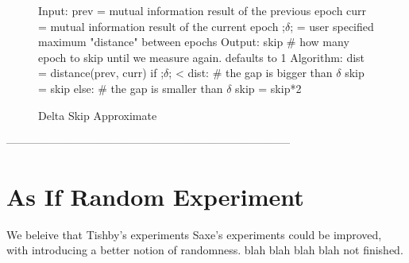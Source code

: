 \begin{figure}[H]
    \begin{pythonfigure}
      Input:
      prev = mutual information result of the previous epoch
      curr = mutual information result of the current epoch
      ;$\delta$; = user specified maximum "distance" between epochs
      Output:
      skip # how many epoch to skip until we measure again. defaults to 1
      Algorithm:
      dist = distance(prev, curr)
      if ;$\delta$; < dist: # the gap is bigger than $\delta$
        skip = skip
      else: # the gap is smaller than $\delta$
        skip = skip*2
    \end{pythonfigure}
    \caption{Delta Skip Approximate}
    \label{fig:deltaapprox}
\end{figure}

-----------------------------------------------------------------------------

\section{As If Random Experiment}

We beleive that Tishby's experiments Saxe's experiments could be improved, with
introducing a better notion of randomness. blah blah blah blah not finished.
